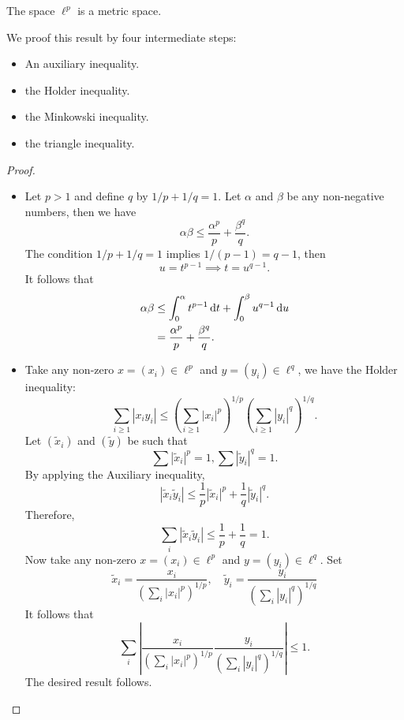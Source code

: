 \begin{proposition}
The space $\ell^p$ is a metric space.
\end{proposition}
We proof this result by four intermediate steps:
\begin{itemize}
\item
An auxiliary inequality.
\item
the 
Holder inequality.
\item
the Minkowski inequality.
\item
the triangle inequality.
\end{itemize}
\begin{proof}
\begin{itemize}
\item
Let $p>1$ and define $q$ by $1/p+1/q=1$.
Let $\alpha$ and $\beta$ be any non-negative numbers, then we have 
\[
\alpha\beta \le \frac{\alpha^p}{p}+\frac{\beta^q}{q}.
\]
The condition $1/p+1/q=1$ implies $1/(p-1)=q-1$, then
\[
u=t^{p-1}\implies t=u^{q-1}.
\]
It follows that
\begin{align*}
\alpha\beta&\le 
\int_0^{\alpha}t^{p-1}\,\mathrm{d} t + \int_0^{\beta}u^{q-1}\,\mathrm{d} u
\\
&=\frac{\alpha^p}{p}+\frac{\beta^q}{q}.
\end{align*}
\item
Take any non-zero $x=(x_i)\in\ell^p$ and $y=(y_i)\in\ell^q$, we have the Holder inequality:
\[
\sum_{i\ge1}|x_iy_i|\le 
\left(
\sum_{i\ge1}|x_i|^p
\right)^{1/p}
\left(
\sum_{i\ge1}|y_i|^q
\right)^{1/q}.
\]
Let $(\tilde{x}_i)$ and $(\tilde{y})$ be such that 
\[
\sum|\tilde{x}_i|^p=1, \sum|\tilde{y}_i|^q=1.
\]
By applying the Auxiliary inequality,
\[
|\tilde{x}_i\tilde{y}_i|\le \frac{1}{p}|\tilde{x}_i|^p + \frac{1}{q}|\tilde{y}_i|^q.
\]
Therefore, 
\[
\sum_i|\tilde{x}_i\tilde{y}_i|\le \frac{1}{p}+\frac{1}{q}=1.
\]
Now take any non-zero $x=(x_i)\in\ell^p$ and $y=(y_i)\in\ell^q$. Set
\[
\tilde{x}_i=\frac{x_i}{\left(
\sum_i|x_i|^p
\right)^{1/p}},\quad
\tilde{y}_i=\frac{y_i}{\left(
\sum_i|y_i|^q
\right)^{1/q}}
\]
It follows that 
\[
\sum_i\left|
\frac{x_i}{\left(
\sum_i|x_i|^p
\right)^{1/p}}
\frac{y_i}{\left(
\sum_i|y_i|^q
\right)^{1/q}}
\right|\le 1.
\]
The desired result follows.
\end{itemize}
\end{proof}








